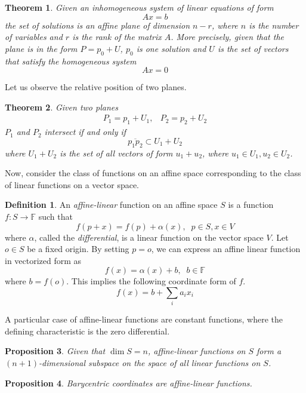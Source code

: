 \documentclass{article}
\newtheorem{theorem}{Theorem}[section]
\newtheorem{proposition}[theorem]{Proposition}
\theoremstyle{remark}
\theoremstyle{definition}
\newtheorem{definition}{Definition}[section]
\begin{document}
\begin{theorem}
Given an inhomogeneous system of linear equations of form 
\[A x = b\]
the set of solutions is an affine plane of dimension $n-r$, where $n$ is the number of variables and $r$ is the rank of the matrix $A$. More precisely, given that the plane is in the form $P = p_0 + U$, $p_0$ is one solution and $U$ is the set of vectors that satisfy the homogeneous system
\[Ax = 0 \]
\end{theorem}

Let us observe the relative position of two planes. 

\begin{theorem}
Given two planes 
\begin{align*}
    P_1 = p_1 + U_1, & P_2 = p_2 + U_2
\end{align*}
$P_1$ and $P_2$ intersect if and only if 
\[\overline{p_1 p_2} \subset U_1 + U_2\]
where $U_1 + U_2$ is the set of all vectors of form $u_1 + u_2$, where $u_1 \in U_1, u_2 \in U_2$. 
\end{theorem}

Now, consider the class of functions on an affine space corresponding to the class of linear functions on a vector space. 

\begin{definition}
An \textit{affine-linear} function on an affine space $S$ is a function $f: S \longrightarrow \mathbb{F}$ such that
\[f(p + x) = f(p) + \alpha (x), \;\; p \in S , x \in V\]
where $\alpha$, called the \textit{differential}, is a linear function on the vector space $V$. Let $o \in S$ be a fixed origin. By setting $p = o$, we can express an affine linear function in vectorized form as 
\[f(x) = \alpha (x) + b, \;\; b \in \mathbb{F}\]
where $b = f(o)$. This implies the following coordinate form of $f$. 
\[f(x) = b + \sum_i a_i x_i\]
\end{definition}

A particular case of affine-linear functions are constant functions, where the defining characteristic is the zero differential. 

\begin{proposition}
Given that $\dim{S} = n$, affine-linear functions on $S$ form a $(n+1)$-dimensional subspace on the space of all linear functions on $S$. 
\end{proposition}

\begin{proposition}
Barycentric coordinates are affine-linear functions. 
\end{proposition}
\end{document}
